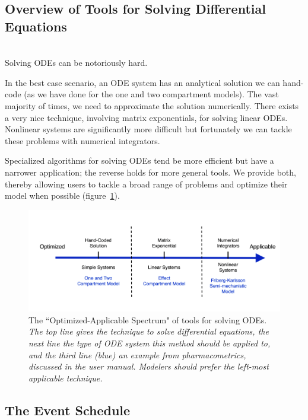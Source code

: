 \documentclass[11pt]{amsart}
\begin{document}
\subsection{Overview of Tools for Solving Differential Equations} \ \\

Solving ODEs can be notoriously hard.

In the best case scenario, an ODE system has an analytical solution we can hand-code
(as we have done for the one and two compartment models). The vast majority of times,
we need to approximate the solution numerically. There exists a very nice technique, 
involving matrix exponentials, for solving linear ODEs. Nonlinear systems are significantly 
more difficult but fortunately we can tackle these problems with numerical integrators.

Specialized algorithms for solving ODEs tend be more efficient but have a narrower application; 
the reverse holds for more general tools. We provide both, thereby allowing users to tackle a 
broad range of problems and optimize their model when possible  (figure~\ref{DiffEqTools}).

\begin{figure}[!htb]
\begin{center}
\includegraphics[width=5in,trim=0in 0in 0 0in]{graphics/ODEsolvers_ext.png}
\caption{{The ``Optimized-Applicable Spectrum" of tools for solving ODEs. \textit{The top 
line gives the technique to solve differential equations, the next line the type of ODE 
system this method should be applied to, and the third line (blue) an example from 
pharmacometrics, discussed in the user manual. Modelers should prefer the left-most 
applicable technique.}}}
\label{DiffEqTools}
\end{center}
\end{figure}

\subsection{The Event Schedule}
\end{document}
